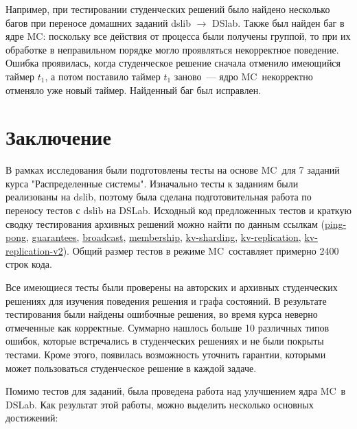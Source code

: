 \documentclass[a4paper,12pt]{extarticle}
\newcommand{\mc}[0]{MC}
\begin{document}
Например, при тестировании студенческих решений было найдено несколько багов при переносе домашних заданий dslib $\to$ DSlab.
Также был найден баг в ядре \mc: поскольку все действия от процесса были получены группой, то при их обработке в неправильном порядке могло проявляться некорректное поведение.
Ошибка проявилась, когда студенческое решение сначала отменило имеющийся таймер $t_1$, а потом поставило таймер $t_1$ заново~--- ядро \mc\ некорректно отменяло уже новый таймер.
Найденный баг был исправлен.

\section{Заключение}
\label{CHAPTER5}

В рамках исследования были подготовлены тесты на основе \mc\ для 7 заданий курса "Распределенные системы".
Изначально тесты к заданиям были реализованы на dslib, поэтому была сделана подготовительная работа по переносу тестов с dslib на DSLab.
Исходный код предложенных тестов и краткую сводку тестирования архивных решений можно найти по данным ссылкам (\href{https://github.com/KiK0S/dslab/pull/6}{ping-pong}, \href{https://github.com/KiK0S/dslab/pull/5}{guarantees}, \href{https://github.com/KiK0S/dslab/pull/7}{broadcast}, \href{https://github.com/KiK0S/dslab/pull/8}{membership}, \href{https://github.com/KiK0S/dslab/pull/9}{kv-sharding}, \href{https://github.com/KiK0S/dslab/pull/10}{kv-replication}, \href{https://github.com/KiK0S/dslab/pull/11}{kv-replication-v2}).
Общий размер тестов в режиме \mc\ составляет примерно 2400 строк кода.

Все имеющиеся тесты были проверены на авторских и архивных студенческих решениях для изучения поведения решения и графа состояний.
В результате тестирования были найдены ошибочные решения, во время курса неверно отмеченные как корректные.
Суммарно нашлось больше 10 различных типов ошибок, которые встречались в студенческих решениях и не были покрыты тестами.
Кроме этого, появилась возможность уточнить гарантии, которыми может пользоваться студенческое решение в каждой задаче.

Помимо тестов для заданий, была проведена работа над улучшением ядра \mc\ в DSLab.
Как результат этой работы, можно выделить несколько основных достижений:

\end{document}

